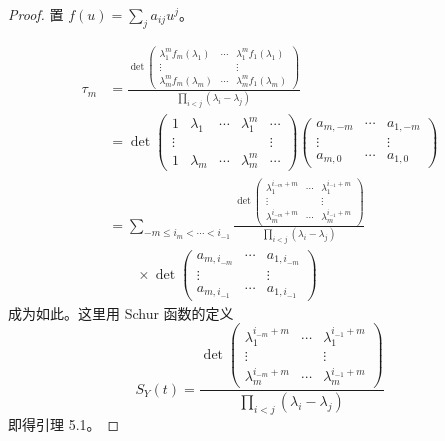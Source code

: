 \begin{proof}
置 $f(u)=\sum_j a_{ij}u^j$。


\[
\begin{aligned}
\tau_m&=
\frac{\det
\begin{pmatrix}
\lambda_1^m f_m(\lambda_1) & \cdots & \lambda_1^m f_1(\lambda_1)\\
\vdots & & \vdots\\
\lambda_m^m f_m(\lambda_m) & \cdots & \lambda_m^m f_1(\lambda_m)
\end{pmatrix}}
{\prod_{i<j}(\lambda_i-\lambda_j)}\\
&=\det
\begin{pmatrix}
1 & \lambda_1 & \cdots & \lambda_1^m & \cdots\\
\vdots & & & & \vdots\\
1 & \lambda_m & \cdots & \lambda_m^m & \cdots
\end{pmatrix}
\begin{pmatrix}
a_{m,-m} & \cdots & a_{1,-m}\\
\vdots & & \vdots\\
a_{m,0} & \cdots & a_{1,0}
\end{pmatrix}\\
&=\sum_{-m\le i_m<\cdots<i_{-1}}
\frac{\det
\begin{pmatrix}
\lambda_1^{i_{-m}+m} & \cdots & \lambda_1^{i_{-1}+m}\\
\vdots & & \vdots\\
\lambda_m^{i_{-m}+m} & \cdots & \lambda_m^{i_{-1}+m}
\end{pmatrix}}
{\prod_{i<j}(\lambda_i-\lambda_j)}\\
&\qquad\times\det
\begin{pmatrix}
a_{m,i_{-m}} & \cdots & a_{1,i_{-m}}\\
\vdots & & \vdots\\
a_{m,i_{-1}} & \cdots & a_{1,i_{-1}}
\end{pmatrix}
\end{aligned}
\]
成为如此。这里用 Schur 函数的定义
\[
S_Y(t)=
\frac{\det
\begin{pmatrix}
\lambda_1^{i_{-m}+m} & \cdots & \lambda_1^{i_{-1}+m}\\
\vdots & & \vdots\\
\lambda_m^{i_{-m}+m} & \cdots & \lambda_m^{i_{-1}+m}
\end{pmatrix}}
{\prod_{i<j}(\lambda_i-\lambda_j)}
\]
即得引理 5.1。
\end{proof}


